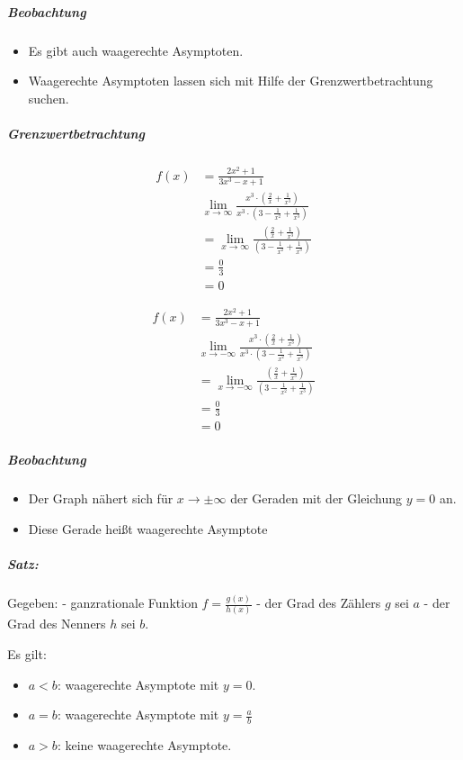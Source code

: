 \documentclass[
  letterpaper,
  DIV=11,
  numbers=noendperiod]{scrartcl}
\let\oldsubparagraph\subparagraph
\renewcommand{\subparagraph}[1]{\oldsubparagraph{#1}\mbox{}}
\providecommand{\tightlist}{%
  \setlength{\itemsep}{0pt}\setlength{\parskip}{0pt}}\usepackage{longtable,booktabs,array}
\begin{document}
\subparagraph{Beobachtung}\label{beobachtung-2}

\begin{itemize}
\tightlist
\item
  Es gibt auch waagerechte Asymptoten.
\item
  Waagerechte Asymptoten lassen sich mit Hilfe der Grenzwertbetrachtung
  suchen.
\end{itemize}

\subparagraph{Grenzwertbetrachtung}\label{grenzwertbetrachtung}

\[
 \begin{aligned}
f(x)&=\frac{2x^2+1}{3x^3-x+1}\\
& \lim_{x \to \infty}\frac{x^3\cdot \left( \frac{2}{x}+ \frac{1}{x^3} \right) }{x^3\cdot \left(3-\frac{1}{x^2}+\frac{1}{x^3}\right)}\\
&= \lim_{x \to \infty}\frac{\left( \frac{2}{x}+ \frac{1}{x^3} \right) }{\left(3-\frac{1}{x^2}+\frac{1}{x^3}\right)}\\
&=\frac{0}{3}\\
&= 0
\end{aligned}
 \]

\[
 \begin{aligned}
f(x)&=\frac{2x^2+1}{3x^3-x+1}\\
&\lim_{x \to -\infty}\frac{x^3\cdot \left( \frac{2}{x}+ \frac{1}{x^3} \right) }{x^3\cdot \left(3-\frac{1}{x^2}+\frac{1}{x^3}\right)}\\
&= \lim_{x \to -\infty}\frac{\left( \frac{2}{x}+ \frac{1}{x^3} \right) }{\left(3-\frac{1}{x^2}+\frac{1}{x^3}\right)}\\
&=\frac{0}{3}\\
&= 0
\end{aligned}
 \]

\subparagraph{Beobachtung}\label{beobachtung-3}

\begin{itemize}
\tightlist
\item
  Der Graph nähert sich für \(x \rightarrow \pm \infty\) der Geraden mit
  der Gleichung \(y=0\) an.
\item
  Diese Gerade heißt waagerechte Asymptote
\end{itemize}

\subparagraph{Satz:}\label{satz-1}

Gegeben: - ganzrationale Funktion \(f=\frac{g(x)}{h(x)}\) - der Grad des
Zählers \(g\) sei \(a\) - der Grad des Nenners \(h\) sei \(b\).

Es gilt:

\begin{itemize}
\tightlist
\item
  \(a < b\): waagerechte Asymptote mit \(y=0\).
\item
  \(a = b\): waagerechte Asymptote mit \(y=\frac{a}{b}\)
\item
  \(a > b\): keine waagerechte Asymptote.
\end{itemize}
\end{document}
